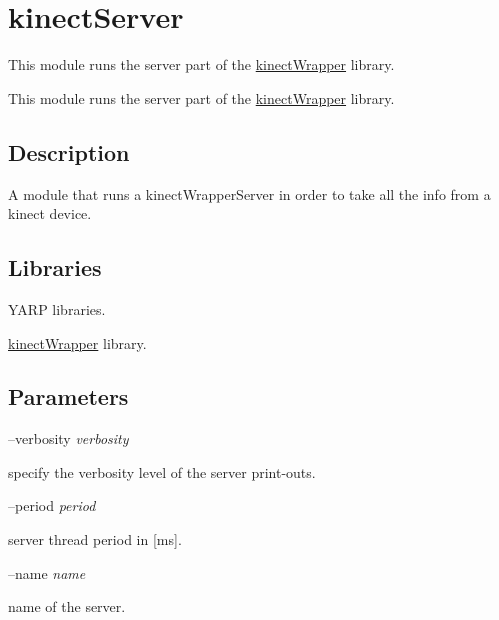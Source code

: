 \section{kinect\+Server}
\label{group__kinectServer}


This module runs the server part of the \hyperlink{group__kinectWrapper}{kinect\+Wrapper} library.  


This module runs the server part of the \hyperlink{group__kinectWrapper}{kinect\+Wrapper} library. 

\hypertarget{group__kinectServer_intro_sec}{}\subsection{Description}\label{group__kinectServer_intro_sec}
A module that runs a kinect\+Wrapper\+Server in order to take all the info from a kinect device.\hypertarget{group__kinectServer_lib_sec}{}\subsection{Libraries}\label{group__kinectServer_lib_sec}

\begin{DoxyItemize}
\item Y\+A\+RP libraries.
\item \hyperlink{group__kinectWrapper}{kinect\+Wrapper} library.
\end{DoxyItemize}\hypertarget{group__kinectServer_parameters_sec}{}\subsection{Parameters}\label{group__kinectServer_parameters_sec}
--verbosity {\itshape verbosity} 
\begin{DoxyItemize}
\item specify the verbosity level of the server print-\/outs.
\end{DoxyItemize}

--period {\itshape period} 
\begin{DoxyItemize}
\item server thread period in \mbox{[}ms\mbox{]}.
\end{DoxyItemize}

--name {\itshape name} 
\begin{DoxyItemize}
\item name of the server.
\end{DoxyItemize}


